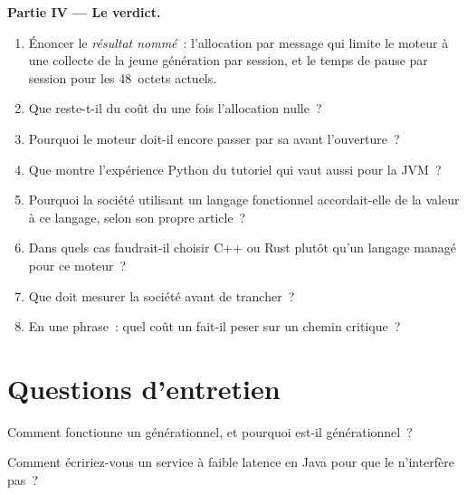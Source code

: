 \begin{problem}
\medskip\noindent\textbf{Partie IV --- Le verdict.}
\begin{enumerate}[resume]
\item Énoncer le \emph{résultat nommé}~: l'allocation par message qui limite le moteur à une collecte de la jeune génération par session,
et le temps de pause par session pour les 48~octets actuels.
\item Que reste-t-il du coût du  une fois l'allocation nulle~?
\item Pourquoi le moteur doit-il encore passer par sa  avant l'ouverture~?
\item Que montre l'expérience Python du tutoriel qui vaut aussi pour la JVM~?
\item Pourquoi la société utilisant un langage fonctionnel accordait-elle de la valeur à ce langage, selon son propre article~?
\item Dans quels cas faudrait-il choisir C++ ou Rust plutôt qu'un langage managé pour ce moteur~?
\item Que doit mesurer la société avant de trancher~?
\item En une phrase~: quel coût un  fait-il peser sur un chemin critique~?
\end{enumerate}
\end{problem}

\section{Questions d'entretien}

\begin{interviewq}\label{iq:ll:managed-and-functional-languages-on-the-desk:1}
Comment fonctionne un  générationnel, et pourquoi est-il générationnel~?
\end{interviewq}

\begin{interviewq}\label{iq:ll:managed-and-functional-languages-on-the-desk:2}
Comment écririez-vous un service à faible latence en Java pour que le  n'interfère pas~?
\end{interviewq}

